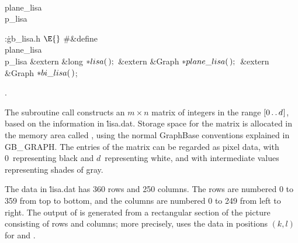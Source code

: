 \Y\B\4\D\\{plane\_lisa}\5
\\{p\_lisa}\par
\Y\B\4:\.{gb\_lisa.h }\X${}\E{}$\6
\8\#\&{define} \\{plane\_lisa}\5\\{p\_lisa}\6
\&{extern} \&{long} ${}{*}\\{lisa}(\,);{}$\6
\&{extern} \&{Graph} ${}{*}\\{plane\_lisa}(\,);{}$\6
\&{extern} \&{Graph} ${}{*}\\{bi\_lisa}(\,){}$;\par
{}.\fi

The subroutine call 
constructs an $m\times n$ matrix of integers in the range
$[0\,.\,.\,d\mskip1mu]$,
based on the information in \.{lisa.dat}. Storage space for the matrix is
allocated in the memory area called , using the normal GraphBase
conventions explained in {\sc GB\_\,GRAPH}.
The entries of the matrix can be regarded as pixel data, with
0~representing black and $d$~representing white, and with intermediate
values representing shades of gray.

The data in \.{lisa.dat} has 360 rows and 250 columns. The rows are numbered
0 to 359 from top to bottom, and the columns are numbered 0 to 249 from left
to right. The output of  is generated from a rectangular section
of the picture consisting of  rows and 
columns; more
precisely,  uses the data in positions $(k,l)$ for
 and .


